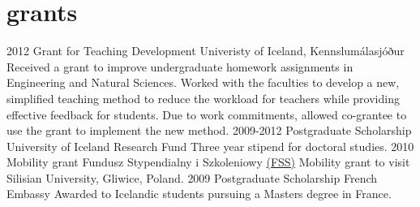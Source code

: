 \documentclass[]{cv} %
\begin{document}
\section{grants}
\begin{entrylist}
    \entry
    {2012}
    {Grant for Teaching Development}
    {Univeristy of Iceland, Kennslumálasjóður}
    {Received a grant to improve undergraduate homework assignments in Engineering and Natural Sciences. Worked with the faculties to develop a new, simplified teaching method to reduce the workload for teachers while providing effective feedback for students. Due to work commitments, allowed co-grantee to use the grant to implement the new method.  }
    \entry
    {2009-2012}
    {Postgraduate Scholarship}
    {University of Iceland Research Fund}
    {Three year stipend for doctoral studies.}
    \entry
    {2010}
    {Mobility grant}
    {Fundusz Stypendialny i Szkoleniowy 
        \href{http://www.fss.org.pl/en/about}{(FSS)}} %
    {Mobility grant to visit Silisian University, Gliwice, Poland.}
    \entry
    {2009}
    {Postgraduate Scholarship}
    {French Embassy}
    {Awarded to Icelandic students pursuing a Masters degree in France.}
\end{entrylist}
\end{document}
